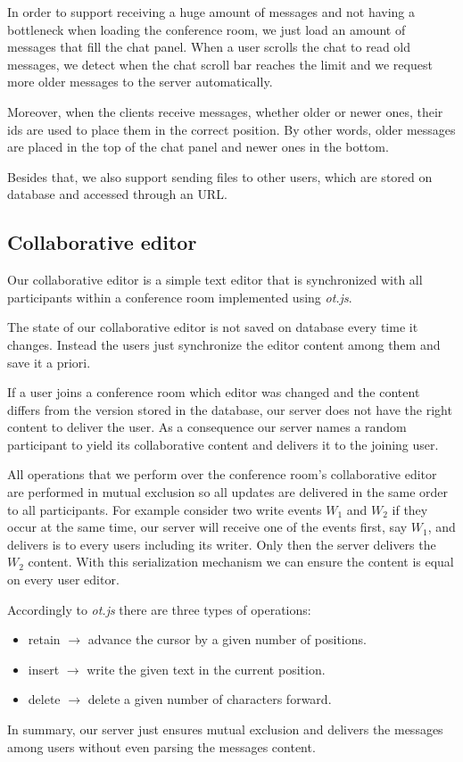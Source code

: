 		In order to support receiving a huge amount of messages and not having a bottleneck when loading the conference room, we just load an amount of messages that fill the chat panel. When a user scrolls the chat to read old messages, we detect when the chat scroll bar reaches the limit and we request more older messages to the server automatically.

		Moreover, when the clients receive messages, whether older or newer ones, their ids are used to place them in the correct position. By other words, older messages are placed in the top of the chat panel and newer ones in the bottom.

		Besides that, we also support sending files to other users, which are stored on database and accessed through an \ac{URL}.

\subsection{Collaborative editor}

Our collaborative editor is a simple text editor that is synchronized with all participants within a conference room implemented using \emph{ot.js}.

The state of our collaborative editor is not saved on database every time it changes. Instead the users just synchronize the editor content among them and save it a priori.

If a user joins a conference room which editor was changed and the content differs from the version stored in the database, our server does not have the right content to deliver the user. As a consequence our server names a random participant to yield its collaborative content and delivers it to the joining user.

All operations that we perform over the conference room's collaborative editor are performed in mutual exclusion so all updates are delivered in the same order to all participants. For example consider two write events $W_1$ and $W_2$ if they occur at the same time, our server will receive one of the events first, say $W_1$, and delivers is to every users including its writer. Only then the server delivers the $W_2$ content. With this serialization mechanism we can ensure the content is equal on every user editor.

Accordingly to \emph{ot.js} there are three types of operations:
\begin{itemize}
\item{retain} $\rightarrow$ advance the cursor by a given number of positions.
\item{insert} $\rightarrow$ write the given text in the current position.
\item{delete} $\rightarrow$ delete a given number of characters forward.
\end{itemize}

In summary, our server just ensures mutual exclusion and delivers the messages among users without even parsing the messages content.